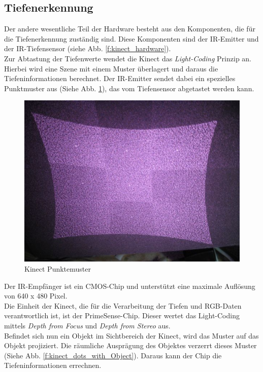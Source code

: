 \subsection{Tiefenerkennung}
	
	Der andere wesentliche Teil der Hardware besteht aus den Komponenten, die für die Tiefenerkennung
	zuständig sind. Diese Komponenten sind der \acf{IR-Emitter} und der IR-Tiefensensor (siehe	 Abb. 	 
	\ref{f:kinect_hardware}).\\
	\noindent
	Zur Abtastung der Tiefenwerte wendet die Kinect das \textit{Light-Coding} Prinzip an. Hierbei wird
	eine Szene mit einem Muster überlagert und daraus die Tiefeninformationen berechnet.
	Der \acs{IR-Emitter} sendet dabei ein spezielles Punktmuster aus (Siehe Abb. \ref{f:kinect_dots}),
	das vom Tiefensensor abgetastet werden kann.	
	
	\begin{figure}[H]						
		\centering							
		\includegraphics[scale=0.5]{Bilder/kinect_dots.jpg}			
		\caption{Kinect Punktemuster}						
		\label{f:kinect_dots}						
	\end{figure}
	
	\noindent	
	Der IR-Empfänger ist ein \acf{CMOS}-Chip und unterstützt eine maximale Auflösung
	von 640 x 480 Pixel.
	\\
	Die Einheit der Kinect, die für die Verarbeitung der Tiefen und RGB-Daten verantwortlich ist, ist
	der PrimeSense-Chip. Dieser wertet das Light-Coding mittels \textit{Depth from Focus} und 
	\textit{Depth from Stereo} aus.\cite{pdf:maccormick}
	\\
	Befindet sich nun ein Objekt im Sichtbereich der Kinect, wird das Muster auf das Objekt projiziert. Die räumliche Ausprägung des Objektes verzerrt dieses Muster (Siehe Abb. \ref{f:kinect_dots_with_Object}). Daraus kann der Chip die Tiefeninformationen errechnen.		
	
